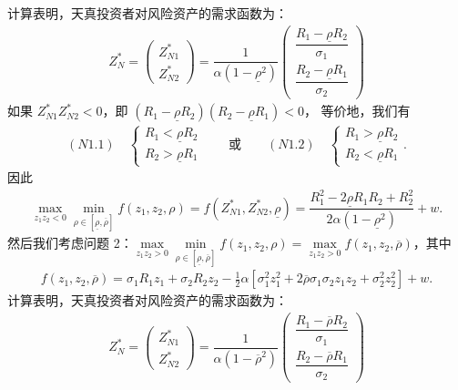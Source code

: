 \documentclass[10.0pt]{article}
\begin{document}
计算表明，天真投资者对风险资产的需求函数为：
\begin{eqnarray}
Z_N^* = \left( \begin{matrix} Z_{N 1}^* \\ Z_{N 2}^* \end{matrix} \right) = \dfrac1{\alpha (1 - \underline{\rho}^2)} \left( \begin{matrix} \dfrac{R_1 - \underline{\rho} R_2}{\sigma_1} \\ \dfrac{R_2 - \underline{\rho} R_1}{\sigma_2} \end{matrix} \right)
\end{eqnarray}
如果 $ Z_{N 1}^* Z_{N 2}^* < 0 $，即 $ (R_1 - \underline{\rho} R_2) (R_2 - \underline{\rho} R_1) < 0 $， 等价地，我们有
\begin{eqnarray}
(N1.1) \quad \left\{ \begin{matrix} R_1 < \underline{\rho} R_2 \\ R_2 > \underline{\rho} R_1 \end{matrix} \right. \qquad \text{或} \qquad (N1.2) \quad \left\{ \begin{matrix} R_1 > \underline{\rho} R_2 \\ R_2 < \underline{\rho} R_1 \end{matrix} \right..
\end{eqnarray}
因此
\begin{eqnarray*}
\max\limits_{z_1 z_2 < 0} \min\limits_{\rho \in [\underline{\rho}, \overline{\rho}]} f (z_1, z_2, \rho) = f (Z_{N 1}^*, Z_{N 2}^*, \underline{\rho}) = \dfrac{R_1^2 - 2 \underline{\rho} R_1 R_2 + R_2^2}{2 \alpha (1 - \underline{\rho}^2)} + w.
\end{eqnarray*}
然后我们考虑问题 2：$ \max\limits_{z_1 z_2 > 0} \min\limits_{\rho \in [\underline{\rho}, \overline{\rho}]} f (z_1, z_2, \rho) = \max\limits_{z_1 z_2 > 0} f (z_1, z_2, \overline{\rho}) $，其中
\begin{eqnarray*}
f (z_1, z_2, \overline{\rho}) = \sigma_1 R_1 z_1 + \sigma_2 R_2 z_2 - \frac12 \alpha [\sigma_1^2 z_1^2 + 2 \overline{\rho} \sigma_1 \sigma_2 z_1 z_2 + \sigma_2^2 z_2^2] + w.
\end{eqnarray*}
计算表明，天真投资者对风险资产的需求函数为：
\begin{eqnarray}
Z_N^* = \left( \begin{matrix} Z_{N 1}^* \\ Z_{N 2}^* \end{matrix} \right) = \dfrac1{\alpha (1 - \overline{\rho}^2)} \left( \begin{matrix} \dfrac{R_1 - \overline{\rho} R_2}{\sigma_1} \\ \dfrac{R_2 - \overline{\rho} R_1}{\sigma_2} \end{matrix} \right)
\end{eqnarray}
\end{document}
